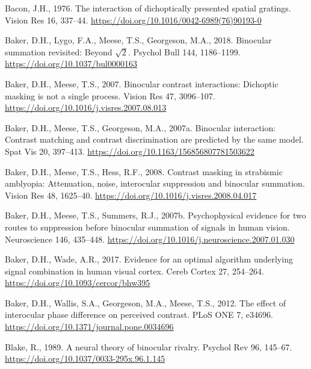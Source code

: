 \documentclass[
  12pt,
]{article}
\newlength{\cslhangindent}
\newenvironment{CSLReferences}[2] %
 {\begin{list}{}{%
  \setlength{\itemindent}{0pt}
  \setlength{\leftmargin}{0pt}
  \setlength{\parsep}{0pt}
  \ifodd #1
   \setlength{\leftmargin}{\cslhangindent}
   \setlength{\itemindent}{-1\cslhangindent}
  \fi
  \setlength{\itemsep}{#2\baselineskip}}}
 {\end{list}}
\begin{document}
\label{refs}
\begin{CSLReferences}{1}{0}
Bacon, J.H., 1976. The interaction of dichoptically presented spatial
gratings. Vision Res 16, 337--44.
\url{https://doi.org/10.1016/0042-6989(76)90193-0}

Baker, D.H., Lygo, F.A., Meese, T.S., Georgeson, M.A., 2018. Binocular
summation revisited: Beyond \(\sqrt{2}\). Psychol Bull 144, 1186--1199.
\url{https://doi.org/10.1037/bul0000163}

Baker, D.H., Meese, T.S., 2007. Binocular contrast interactions:
Dichoptic masking is not a single process. Vision Res 47, 3096--107.
\url{https://doi.org/10.1016/j.visres.2007.08.013}

Baker, D.H., Meese, T.S., Georgeson, M.A., 2007a. Binocular interaction:
Contrast matching and contrast discrimination are predicted by the same
model. Spat Vis 20, 397--413.
\url{https://doi.org/10.1163/156856807781503622}

Baker, D.H., Meese, T.S., Hess, R.F., 2008. Contrast masking in
strabismic amblyopia: Attenuation, noise, interocular suppression and
binocular summation. Vision Res 48, 1625--40.
\url{https://doi.org/10.1016/j.visres.2008.04.017}

Baker, D.H., Meese, T.S., Summers, R.J., 2007b. Psychophysical evidence
for two routes to suppression before binocular summation of signals in
human vision. Neuroscience 146, 435--448.
\url{https://doi.org/10.1016/j.neuroscience.2007.01.030}

Baker, D.H., Wade, A.R., 2017. Evidence for an optimal algorithm
underlying signal combination in human visual cortex. Cereb Cortex 27,
254--264. \url{https://doi.org/10.1093/cercor/bhw395}

Baker, D.H., Wallis, S.A., Georgeson, M.A., Meese, T.S., 2012. The
effect of interocular phase difference on perceived contrast. PLoS ONE
7, e34696. \url{https://doi.org/10.1371/journal.pone.0034696}

Blake, R., 1989. A neural theory of binocular rivalry. Psychol Rev 96,
145--67. \url{https://doi.org/10.1037/0033-295x.96.1.145}


\end{CSLReferences}
\end{document}
